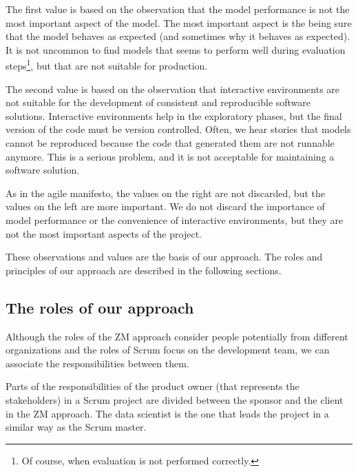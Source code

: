 The first value is based on the observation that the model performance is not the most
important aspect of the model.  The most important aspect is the being sure that the model
behaves as expected (and sometimes why it behaves as expected).  It is not uncommon to find
models that seems to perform well during evaluation steps\footnote{Of course, when
evaluation is not performed correctly.}, but that are not suitable for production.

The second value is based on the observation that interactive environments are not suitable
for the development of consistent and reproducible software solutions.  Interactive environments
help in the exploratory phases, but the final version of the code must be version
controlled.  Often, we hear stories that models cannot be reproduced because the code that
generated them are not runnable anymore.  This is a serious problem, and it is not
acceptable for maintaining a software solution.

As in the agile manifesto, the values on the right are not discarded, but the values on the
left are more important.  We do not discard the importance of model performance or the
convenience of interactive environments, but they are not the most important aspects of the
project.

These observations and values are the basis of our approach.  The roles and principles of
our approach are described in the following sections.

\subsection{The roles of our approach}

Although the roles of the ZM approach consider people potentially from different
organizations and the roles of Scrum focus on the development team, we can associate the
responsibilities between them.

Parts of the responsibilities of the product owner (that represents the stakeholders) in a
Scrum project are divided between the sponsor and the client in the ZM approach.  The data
scientist is the one that leads the project in a similar way as the Scrum master.

